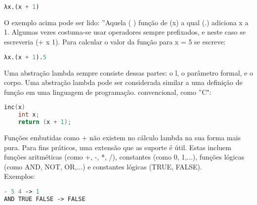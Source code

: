 \begin{tcolorbox}[colback=gray!5!white, colframe=gray!75!black, title={Quadro 1 - Exemplo de Estrutura Lambda}]
\begin{lstlisting}[language=Lisp]
λx.(x + 1)
\end{lstlisting}
\caption{}
\end{tcolorbox}

O exemplo acima pode ser lido: ''Aquela ( ) função de (x) a qual (.) adiciona x a 1. Algumas vezes costuma-se usar operadores sempre prefixados, e neste caso se escreveria (+ x 1). Para calcular o valor da função para x = 5 se escreve:


\begin{tcolorbox}[colback=gray!5!white, colframe=gray!75!black, title={Quadro 2 - Cálculo do Valor de uma Função Lambda}]
\begin{lstlisting}[language=Lisp]
λx.(x + 1).5
\end{lstlisting}
\caption{}
\end{tcolorbox}

Uma abstração lambda sempre consiste dessas partes: o l, o parâmetro formal,  e o corpo. Uma abstração lambda pode ser considerada similar a uma definição de função em uma linguagem de programação. convencional, como ''C":

\begin{tcolorbox}[colback=gray!5!white, colframe=gray!75!black, title={Quadro 3 - Exemplo de Função em C}]
\begin{lstlisting}[language=C]
inc(x)
    int x;
    return (x + 1);
\end{lstlisting}
\caption{}
\end{tcolorbox}

Funções embutidas como + não existem no cálculo lambda na sua forma mais pura. Para fins práticos, uma extensão que as suporte é útil. Estas incluem funções aritméticas (como +, -, *, /), constantes (como 0, 1,...), funções lógicas (como AND, NOT, OR,...) e constantes lógicas (TRUE, FALSE).\\

Exemplos:


\begin{tcolorbox}[colback=gray!5!white, colframe=gray!75!black, title={Quadro 4 - Exemplos de Funções Aritméticas e Lógicas}]
\begin{lstlisting}[language=Lisp]
- 5 4 -> 1
AND TRUE FALSE -> FALSE
\end{lstlisting}
\caption{}
\end{tcolorbox}

